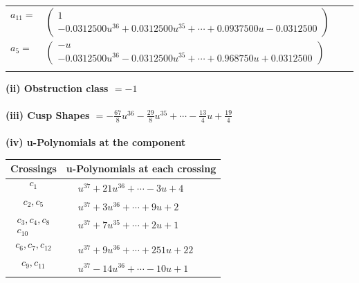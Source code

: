\documentclass[1p]{elsarticle_modified}
\theoremstyle{definition}
\begin{document}
\begin{tabular}{m{7pt} m{180pt} m{7pt} m{180pt} }
\flushright $a_{11}=$&$\begin{pmatrix}1\\-0.0312500 u^{36}+0.0312500 u^{35}+\cdots+0.0937500 u-0.0312500\end{pmatrix}$ \\
\flushright $a_{5}=$&$\begin{pmatrix}- u\\-0.0312500 u^{36}-0.0312500 u^{35}+\cdots+0.968750 u+0.0312500\end{pmatrix}$\\&\end{tabular}
\flushleft \textbf{(ii) Obstruction class $= -1$}\\~\\
\flushleft \textbf{(iii) Cusp Shapes $= -\frac{67}{8} u^{36}-\frac{29}{8} u^{35}+\cdots-\frac{13}{4} u+\frac{19}{4}$}\\~\\
\newpage\renewcommand{\arraystretch}{1}
\flushleft \textbf{(iv) u-Polynomials at the component}\newline \\
\begin{tabular}{m{50pt}|m{274pt}}
Crossings & \hspace{64pt}u-Polynomials at each crossing \\
\hline $$\begin{aligned}c_{1}\end{aligned}$$&$\begin{aligned}
&u^{37}+21 u^{36}+\cdots-3 u+4
\end{aligned}$\\
\hline $$\begin{aligned}c_{2},c_{5}\end{aligned}$$&$\begin{aligned}
&u^{37}+3 u^{36}+\cdots+9 u+2
\end{aligned}$\\
\hline $$\begin{aligned}c_{3},c_{4},c_{8}\\c_{10}\end{aligned}$$&$\begin{aligned}
&u^{37}+7 u^{35}+\cdots+2 u+1
\end{aligned}$\\
\hline $$\begin{aligned}c_{6},c_{7},c_{12}\end{aligned}$$&$\begin{aligned}
&u^{37}+9 u^{36}+\cdots+251 u+22
\end{aligned}$\\
\hline $$\begin{aligned}c_{9},c_{11}\end{aligned}$$&$\begin{aligned}
&u^{37}-14 u^{36}+\cdots-10 u+1
\end{aligned}$\\
\hline
\end{tabular}\\~\\
\end{document}
